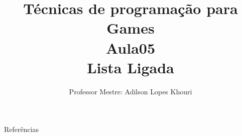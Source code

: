 \documentclass[compress, hyperref={pdfpagelayout=SinglePage}]{beamer}
\title[AED - Aula 05]{Técnicas de programação para Games \\ Aula05 \\ Lista Ligada}
\author{Professor Mestre: Adilson Lopes Khouri}
\begin{document}
	\begin{frame}
		\titlepage
	\end{frame}

	
	
	
	

	
	
	

	


	\begin{frame}{}
		\begin{block}{Referências}
			\tiny
			\nocite{*}
			
	    		
		\end{block}
	\end{frame}
\end{document}
